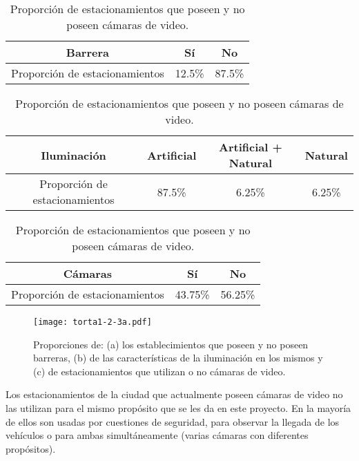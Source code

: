 \begin{table}[htbp]
	\begin{center}
		\begin{tabular}{|c|c|c|}
			\hline
			Barrera & Sí & No\\
			\hline \hline
			Proporción de estacionamientos & 12.5\% & 87.5\% \\ \hline
		\end{tabular}
		\caption{Proporción de estacionamientos que poseen y no poseen barrera.}
		\label{tabla:est_con_barr}
	\end{center}
	\quad
	\begin{center}
		\begin{tabular}{|c|c|c|c|}
			\hline
			Iluminación & Artificial & Artificial + Natural & Natural\\
			\hline \hline
			Proporción de estacionamientos & 87.5\% & 6.25\% & 6.25\%\\ \hline
		\end{tabular}
		\caption{Característica de la iluminación de los estacionamientos relevados.}
		\label{tabla:est_ilum}
	\end{center}
	\quad
	\begin{center}
		\begin{tabular}{|c|c|c|}
			\hline
			Cámaras & Sí & No\\
			\hline \hline
			Proporción de estacionamientos & 43.75\% & 56.25\% \\ \hline
		\end{tabular}
		\caption{Proporción de estacionamientos que poseen y no poseen cámaras de video.}
		\label{tabla:est_cam}
	\end{center}
\end{table}


\begin{figure}[htb]
	\centering
	\texttt{[image: torta1-2-3a.pdf]}
	\caption{Proporciones de: (a) los establecimientos que poseen y no poseen barreras, (b) de las características de la iluminación en los mismos y (c) de estacionamientos que utilizan o no cámaras de video.}
	\label{fig:img_torta1-2-3}
\end{figure}



Los estacionamientos de la ciudad que actualmente poseen cámaras de video no las utilizan para el mismo propósito que se les da en este proyecto. En la mayoría de ellos son usadas por cuestiones de seguridad, para observar la llegada de los vehículos o para ambas simultáneamente (varias cámaras con diferentes propósitos).

